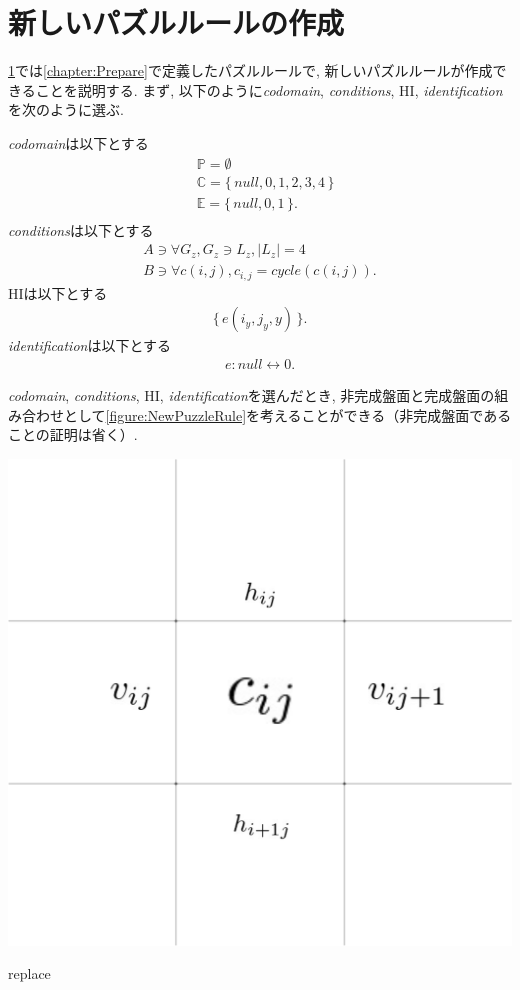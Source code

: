 \section{新しいパズルルールの作成}\label{section:NewPuzzleRule}
\cref{section:NewPuzzleRule}では\cref{chapter:Prepare}で定義したパズルルールで, 新しいパズルルールが作成できることを説明する. まず, 以下のように\textit{codomain}, \textit{conditions}, HI, \textit{identification}を次のように選ぶ.

\textit{codomain}は以下とする
\begin{align}
   & \mathbb{P}=\emptyset                       \\
   & \mathbb{C}=\{\,\textit{null},0,1,2,3,4\,\} \\
   & \mathbb{E}=\{\,\textit{null},0,1\,\}  .    \\
\end{align}
\textit{conditions}は以下とする
\begin{align}
  A\ni \forall G_z, G_z\ni L_z, |L_z|=4 \\
  B\ni \forall c(i,j), c_{i,j}= cycle(c(i,j)).
\end{align}
HIは以下とする
\begin{align}
  \{\,e(i_y,j_y,y)\,\}.
\end{align}
\textit{identification}は以下とする
\begin{align}
  e:\textit{null}\leftrightarrow 0.
\end{align}

\textit{codomain}, \textit{conditions}, HI, \textit{identification}を選んだとき, 非完成盤面と完成盤面の組み合わせとして\cref{figure:NewPuzzleRule}を考えることができる（非完成盤面であることの証明は省く）.

\begin{clearpagefigure}
  \includegraphics[width=0.8\linewidth,clip]{fig/cycle.png}
  \caption{replace}
  \label{figure:SlitherLinkQuestion}
\end{clearpagefigure}

